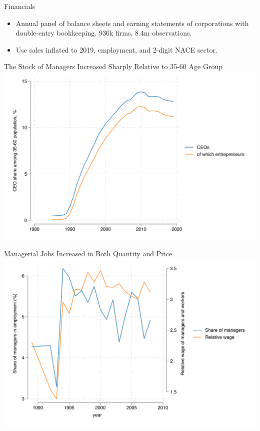 \documentclass[
  ignorenonframetext,
  aspectratio=1610,
]{beamer}
\providecommand{\tightlist}{%
  \setlength{\itemsep}{0pt}\setlength{\parskip}{0pt}}
\begin{document}
\begin{frame}{Financials}
\protect\hypertarget{financials}{}
\begin{itemize}
\tightlist
\item
  Annual panel of balance sheets and earning statements of corporations
  with double-entry bookkeeping. 936k firms, 8.4m observations.
\item
  Use sales inflated to 2019, employment, and 2-digit NACE sector.
\end{itemize}
\end{frame}

\begin{frame}{The Stock of Managers Increased Sharply Relative to 35-60
Age Group}
\protect\hypertarget{the-stock-of-managers-increased-sharply-relative-to-35-60-age-group}{}
\includegraphics{fig/ceo-stock.png}
\end{frame}

\begin{frame}{Managerial Jobs Increased in Both Quantity and Price}
\protect\hypertarget{managerial-jobs-increased-in-both-quantity-and-price}{}
\includegraphics{fig/fixed/age-relative-wage.png}
\end{frame}
\end{document}
